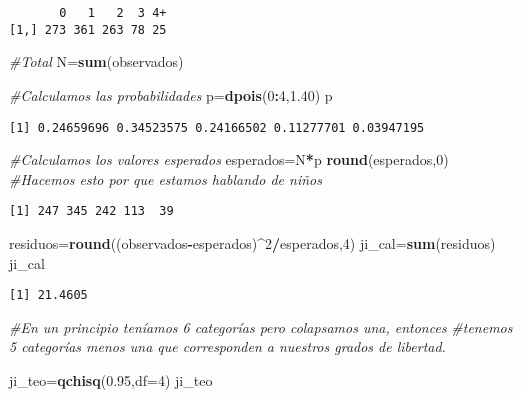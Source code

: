 \documentclass[
  a4paper,
  oneside,
  openany]{book}
\newenvironment{Shaded}{\begin{snugshade}}{\end{snugshade}}
\newcommand{\AttributeTok}[1]{\textcolor[rgb]{0.13,0.29,0.53}{#1}}
\newcommand{\CommentTok}[1]{\textcolor[rgb]{0.56,0.35,0.01}{\textit{#1}}}
\newcommand{\DecValTok}[1]{\textcolor[rgb]{0.00,0.00,0.81}{#1}}
\newcommand{\FloatTok}[1]{\textcolor[rgb]{0.00,0.00,0.81}{#1}}
\newcommand{\FunctionTok}[1]{\textcolor[rgb]{0.13,0.29,0.53}{\textbf{#1}}}
\newcommand{\NormalTok}[1]{#1}
\newcommand{\OtherTok}[1]{\textcolor[rgb]{0.56,0.35,0.01}{#1}}
\newcommand{\SpecialCharTok}[1]{\textcolor[rgb]{0.81,0.36,0.00}{\textbf{#1}}}
\begin{document}
\begin{verbatim}
       0   1   2  3 4+
[1,] 273 361 263 78 25
\end{verbatim}

\begin{Shaded}
\begin{Highlighting}[]
\CommentTok{\#Total}
\NormalTok{N}\OtherTok{=}\FunctionTok{sum}\NormalTok{(observados)}

\CommentTok{\#Calculamos las probabilidades}
\NormalTok{p}\OtherTok{=}\FunctionTok{dpois}\NormalTok{(}\DecValTok{0}\SpecialCharTok{:}\DecValTok{4}\NormalTok{,}\FloatTok{1.40}\NormalTok{)}
\NormalTok{p}
\end{Highlighting}
\end{Shaded}

\begin{verbatim}
[1] 0.24659696 0.34523575 0.24166502 0.11277701 0.03947195
\end{verbatim}

\begin{Shaded}
\begin{Highlighting}[]
\CommentTok{\#Calculamos los valores esperados}
\NormalTok{esperados}\OtherTok{=}\NormalTok{N}\SpecialCharTok{*}\NormalTok{p}
\FunctionTok{round}\NormalTok{(esperados,}\DecValTok{0}\NormalTok{) }\CommentTok{\#Hacemos esto por que estamos hablando de niños}
\end{Highlighting}
\end{Shaded}

\begin{verbatim}
[1] 247 345 242 113  39
\end{verbatim}

\begin{Shaded}
\begin{Highlighting}[]
\NormalTok{residuos}\OtherTok{=}\FunctionTok{round}\NormalTok{((observados}\SpecialCharTok{{-}}\NormalTok{esperados)}\SpecialCharTok{\^{}}\DecValTok{2}\SpecialCharTok{/}\NormalTok{esperados,}\DecValTok{4}\NormalTok{)}
\NormalTok{ji\_cal}\OtherTok{=}\FunctionTok{sum}\NormalTok{(residuos)}
\NormalTok{ji\_cal}
\end{Highlighting}
\end{Shaded}

\begin{verbatim}
[1] 21.4605
\end{verbatim}

\begin{Shaded}
\begin{Highlighting}[]
\CommentTok{\#En un principio teníamos 6 categorías pero colapsamos una, entonces }
\CommentTok{\#tenemos 5 categorías menos una que corresponden a nuestros grados de libertad.}

\NormalTok{ji\_teo}\OtherTok{=}\FunctionTok{qchisq}\NormalTok{(}\FloatTok{0.95}\NormalTok{,}\AttributeTok{df=}\DecValTok{4}\NormalTok{)}
\NormalTok{ji\_teo}
\end{Highlighting}
\end{Shaded}
\end{document}
